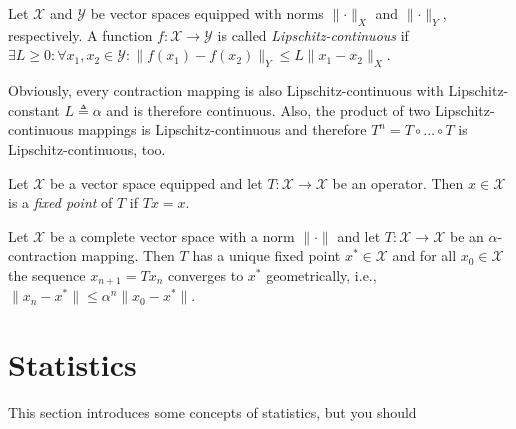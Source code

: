 		\begin{definition}
			Let \(\mathcal{X}\) and \(\mathcal{Y}\) be vector spaces equipped with norms \(\lVert \cdot \rVert_X\) and \(\lVert \cdot \rVert_Y\), respectively. A function \( f : \mathcal{X} \to \mathcal{Y} \) is called \emph{Lipschitz-continuous} if \( \exists L \geq 0 : \forall x_1, x_2 \in \mathcal{Y} : \lVert f(x_1) - f(x_2) \rVert_Y \leq L \lVert x_1 - x_2 \rVert_X \).
		\end{definition}

		\begin{remark}
			Obviously, every contraction mapping is also Lipschitz-continuous with Lipschitz-constant \(L \triangleq \alpha\) and is therefore continuous. Also, the product of two Lipschitz-continuous mappings is Lipschitz-continuous and therefore \(T^n = T \circ \dots \circ T\) is Lipschitz-continuous, too.
		\end{remark}

		\begin{definition}
			Let \(\mathcal{X}\) be a vector space equipped and let \( T : \mathcal{X} \to \mathcal{X} \) be an operator. Then \(x \in \mathcal{X}\) is a \emph{fixed point} of \(T\) if \( T x = x \).
		\end{definition}

		\begin{theorem}
			Let \(\mathcal{X}\) be a complete vector space with a norm \(\lVert \cdot \rVert\) and let \( T : \mathcal{X} \to \mathcal{X} \) be an \(\alpha\)-contraction mapping. Then \(T\) has a unique fixed point \(x^\ast \in \mathcal{X}\) and for all \(x_0 \in \mathcal{X}\) the sequence \( x_{n + 1} = T x_n \) converges to \(x^\ast\) geometrically, i.e., \( \lVert x_n - x^\ast \rVert \leq \alpha^n \lVert x_0 - x^\ast \rVert \).
		\end{theorem}

	\section{Statistics}
		This section introduces some concepts of statistics, but you should

